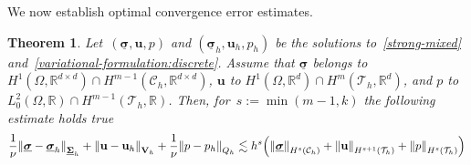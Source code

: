 \documentclass[a4paper,twoside,10pt]{article}
\theoremstyle{plain}
\newtheorem{theorem}{Theorem}[section]
\theoremstyle{remark}
\theoremstyle{definition}
\numberwithin{equation}{section}
\numberwithin{figure}{section}
\newcommand{\Norm}[1]{{\left\|{#1} \right\|}}
\newcommand{\Ccalh}{\mathcal{C}_h}
\newcommand{\Tauh}{\mathcal{T}_h}
\newcommand{\Rbb}{\mathbb{R}}
\newcommand{\Rbbd}{\mathbb{R}^d}
\newcommand{\Rbbdd}{\mathbb{R}^{d\times d}}
\newcommand{\Sigmah}{\underline{\boldsymbol{\Sigma}}_h}
\newcommand{\Vh}{{\bf{V}}_h}
\newcommand{\Qh}{Q_h}
\newcommand{\sigmabfh}{\underline{\boldsymbol{\sigma}}_h}
\newcommand{\ubfh}{\mathbf{u}_h}
\newcommand{\ph}{p_h}
\newcommand{\sigmabf}{\underline{\boldsymbol{\sigma}}}
\newcommand{\ubf}{\mathbf{u}}
\newcommand{\p}{p}
\begin{document}
We now establish optimal convergence error estimates.
\begin{theorem} \label{theorem:error-estimates}
Let~$(\sigmabf,\ubf,\p)$ and $(\sigmabfh,\ubfh,\ph)$
be the solutions to~\eqref{strong-mixed} and~\eqref{variational-formulation:discrete}.
Assume that $\sigmabf$ belongs to $H^1(\Omega,\Rbbdd)\cap H^{m-1}(\Ccalh,\Rbbdd)$,
$\ubf$ to $H^1(\Omega,\Rbbd)\cap H^{m}(\Tauh,\Rbbd)$,
and $\p$ to $L^2_0(\Omega,\Rbb)\cap H^{m-1}(\Tauh,\Rbb)$.
Then,
for~$s := \min(m-1,k)$
the following estimate holds true
\begin{equation*}
 \frac{1}{\nu}\Norm{\sigmabf-\sigmabfh}_{\Sigmah} + \Norm{\ubf-\ubfh}_{\Vh} + \frac{1}{\nu}\Norm{\p-\ph}_{\Qh}
    \lesssim h^s\Big(\Norm{\sigmabf}_{H^{s}(\Ccalh)} + \Norm{\ubf}_{H^{s+1}(\Tauh)} +\Norm{\p}_{H^{s}(\Tauh)} \Big)
\end{equation*}
\end{theorem}
\end{document}
